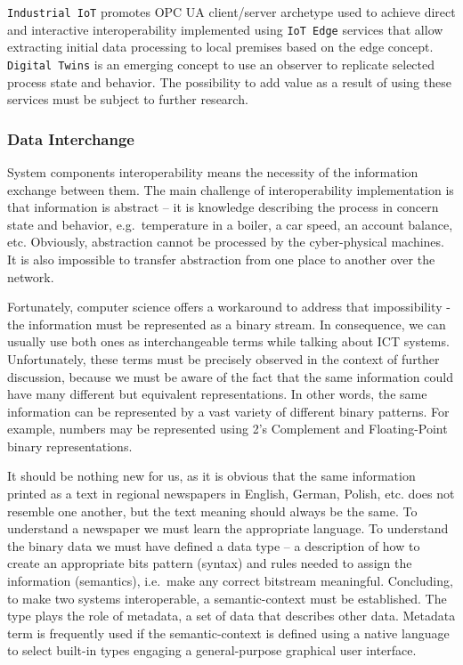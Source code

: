 \documentclass{jacsart}
\begin{document}
\texttt{Industrial\ IoT} promotes OPC UA client/server archetype used to
achieve direct and interactive interoperability implemented using
\texttt{IoT\ Edge} services that allow extracting initial data
processing to local premises based on the edge concept.
\texttt{Digital\ Twins} is an emerging concept to use an observer to
replicate selected process state and behavior. The possibility to add
value as a result of using these services must be subject to further
research.

\subsubsection{Data Interchange}\label{data-interchange}

System components interoperability means the necessity of the
information exchange between them. The main challenge of
interoperability implementation is that information is abstract -- it is
knowledge describing the process in concern state and behavior,
e.g.~temperature in a boiler, a car speed, an account balance, etc.
Obviously, abstraction cannot be processed by the cyber-physical
machines. It is also impossible to transfer abstraction from one place
to another over the network.

Fortunately, computer science offers a workaround to address that
impossibility - the information must be represented as a binary stream.
In consequence, we can usually use both ones as interchangeable terms
while talking about ICT systems. Unfortunately, these terms must be
precisely observed in the context of further discussion, because we must
be aware of the fact that the same information could have many different
but equivalent representations. In other words, the same information can
be represented by a vast variety of different binary patterns. For
example, numbers may be represented using 2's Complement and
Floating-Point binary representations.

It should be nothing new for us, as it is obvious that the same
information printed as a text in regional newspapers in English, German,
Polish, etc. does not resemble one another, but the text meaning should
always be the same. To understand a newspaper we must learn the
appropriate language. To understand the binary data we must have defined
a data type -- a description of how to create an appropriate bits
pattern (syntax) and rules needed to assign the information (semantics),
i.e.~make any correct bitstream meaningful. Concluding, to make two
systems interoperable, a semantic-context must be established. The type
plays the role of metadata, a set of data that describes other data.
Metadata term is frequently used if the semantic-context is defined
using a native language to select built-in types engaging a
general-purpose graphical user interface.
\end{document}
